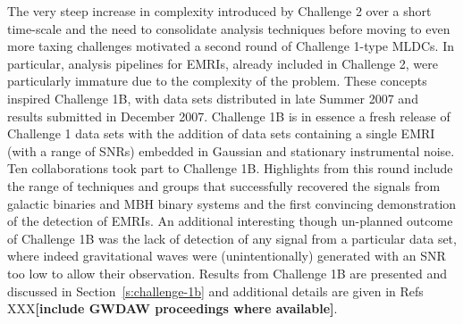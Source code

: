 \documentclass{iopart}
\begin{document}

The very steep increase in complexity introduced by Challenge 2 over a short time-scale and the need to consolidate analysis techniques before moving to even more taxing challenges motivated a second round of Challenge 1-type MLDCs. In particular, analysis pipelines for EMRIs, already included in Challenge 2, were particularly immature due to the complexity of the problem. These concepts inspired Challenge 1B, with data sets distributed in late Summer 2007 and results submitted in December 2007. Challenge 1B is in essence a fresh release of Challenge 1 data sets with the addition of data sets containing a single EMRI (with a range of SNRs) embedded in Gaussian and stationary instrumental noise. Ten collaborations took part to Challenge 1B. Highlights from this round include the range of techniques and groups that successfully recovered the signals from galactic binaries and MBH binary systems and the first convincing demonstration of the detection of EMRIs. An additional interesting though un-planned outcome of Challenge 1B was the lack of detection of any signal from a particular data set, where indeed gravitational waves were (unintentionally) generated with an SNR too low to allow their observation. Results from Challenge 1B are presented and discussed in Section~\ref{s:challenge-1b} and additional details are given in Refs XXX\textbf{[include GWDAW proceedings where available]}.
\end{document}

